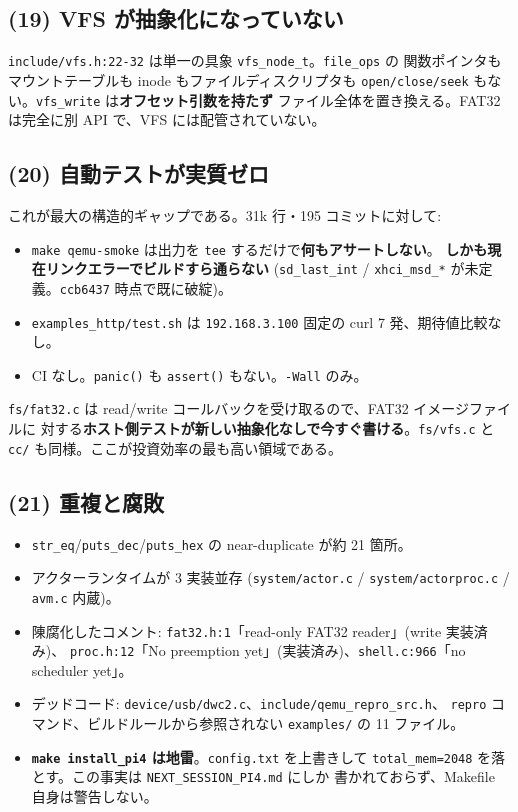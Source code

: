 \documentclass[a4paper,11pt]{ltjsarticle}
\begin{document}
\subsection{(19) VFS が抽象化になっていない}

\texttt{include/vfs.h:22-32} は単一の具象 \texttt{vfs\_node\_t}。\texttt{file\_ops} の
関数ポインタもマウントテーブルも inode もファイルディスクリプタも
\texttt{open/close/seek} もない。\texttt{vfs\_write} は\textbf{オフセット引数を持たず}
ファイル全体を置き換える。FAT32 は完全に別 API で、VFS には配管されていない。

\subsection{(20) 自動テストが実質ゼロ}

これが最大の構造的ギャップである。31k 行・195 コミットに対して:

\begin{itemize}[leftmargin=1.4em,itemsep=2pt]
\item \texttt{make qemu-smoke} は出力を \texttt{tee} するだけで\textbf{何もアサートしない}。
      \textbf{しかも現在リンクエラーでビルドすら通らない} (\texttt{sd\_last\_int} /
      \texttt{xhci\_msd\_*} が未定義。\texttt{ccb6437} 時点で既に破綻)。
\item \texttt{examples\_http/test.sh} は \texttt{192.168.3.100} 固定の curl 7 発、期待値比較なし。
\item CI なし。\texttt{panic()} も \texttt{assert()} もない。\texttt{-Wall} のみ。
\end{itemize}

\texttt{fs/fat32.c} は read/write コールバックを受け取るので、FAT32 イメージファイルに
対する\textbf{ホスト側テストが新しい抽象化なしで今すぐ書ける}。\texttt{fs/vfs.c} と
\texttt{cc/} も同様。ここが投資効率の最も高い領域である。

\subsection{(21) 重複と腐敗}

\begin{itemize}[leftmargin=1.4em,itemsep=2pt]
\item \texttt{str\_eq}/\texttt{puts\_dec}/\texttt{puts\_hex} の near-duplicate が約 21 箇所。
\item アクターランタイムが 3 実装並存 (\texttt{system/actor.c} / \texttt{system/actorproc.c} /
      \texttt{avm.c} 内蔵)。
\item 陳腐化したコメント: \texttt{fat32.h:1}「read-only FAT32 reader」(write 実装済み)、
      \texttt{proc.h:12}「No preemption yet」(実装済み)、\texttt{shell.c:966}「no scheduler yet」。
\item デッドコード: \texttt{device/usb/dwc2.c}、\texttt{include/qemu\_repro\_src.h}、
      \texttt{repro} コマンド、ビルドルールから参照されない \texttt{examples/} の 11 ファイル。
\item \textbf{\texttt{make install\_pi4} は地雷}。\texttt{config.txt} を上書きして
      \texttt{total\_mem=2048} を落とす。この事実は \texttt{NEXT\_SESSION\_PI4.md} にしか
      書かれておらず、Makefile 自身は警告しない。
\end{itemize}
\end{document}
